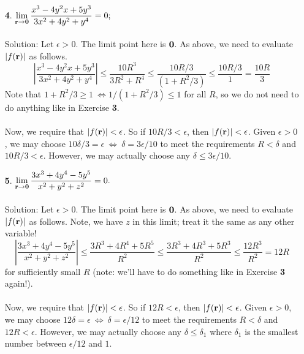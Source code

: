 \documentclass[12pt]{amsbook}
\begin{document}
\begin{enumerate}
\\
\item[{\small\bf 4}.] $\! \begin{aligned}[t]
 \lim_{{\bf r} \rightarrow {\bf 0}}\frac{x^3-4y^2x+5y^3}{3x^2+4y^2+y^4}=0;
\end{aligned}$ 
\\
\\
{\sc Solution}: Let $\epsilon >0$. The limit point here is ${\bf 0}$. As above, we need to evaluate $|f({\bf r})|$ as follows. 
$$|\frac{x^3-4y^2x+5y^3}{3x^2+4y^2+y^4}|\leq \frac{10R^3}{3R^2+R^4} \leq \frac{10R/3}{(1+R^2/3)} \leq  \frac{10R/3}{1} =\frac{10R}{3}$$
Note that $1+R^2/3 \geq 1 \ \Leftrightarrow 1/(1+R^2/3) \leq 1$ for all $R$, so we do not need to do anything like in Exercise {\bf 3}.
\\
\\
Now, we require that $|f({\bf r})|<\epsilon$. So if $10R/3<\epsilon$, then $|f({\bf r})|< \epsilon$. Given $\epsilon>0$, we may choose $10\delta/3=\epsilon \ \Leftrightarrow \ \delta=3\epsilon/10$ to meet the requirements $R<\delta$ and $10R/3<\epsilon$. However, we may actually choose any $\delta \leq 3\epsilon/10$. 
\\
\item[{\small\bf 5}.] $\! \begin{aligned}[t]
 \lim_{{\bf r} \rightarrow {\bf 0}}\frac{3x^3+4y^4-5y^5}{x^2+y^2+z^2}=0.
\end{aligned}$ 
\\
\\
{\sc Solution}: Let $\epsilon >0$. The limit point here is ${\bf 0}$. As above, we need to evaluate $|f({\bf r})|$ as follows. Note, we have $z$ in this limit; treat it the same as any other variable!
$$|\frac{3x^3+4y^4-5y^5}{x^2+y^2+z^2}|\leq \frac{3R^3+4R^4+5R^5}{R^2} \leq \frac{3R^3+4R^3+5R^3}{R^2} \leq  \frac{12R^3}{R^2} =12R$$
for sufficiently small $R$ (note: we'll have to do something like in Exercise {\bf 3} again!).
\\
\\
Now, we require that $|f({\bf r})|<\epsilon$. So if $12R<\epsilon$, then $|f({\bf r})|< \epsilon$. Given $\epsilon>0$, we may choose $12\delta=\epsilon \ \Leftrightarrow \ \delta=\epsilon/12$ to meet the requirements $R<\delta$ and $12R<\epsilon$. However, we may actually choose any $\delta \leq \delta_1$ where $\delta_1$ is the smallest number between $\epsilon/12$ and $1$. 
\\
\end{enumerate}
\end{document}
